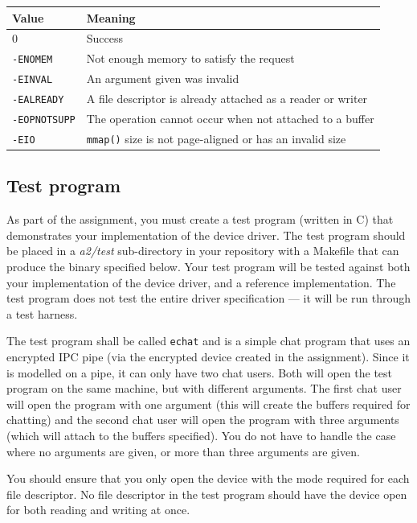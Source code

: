 \documentclass[12pt,a4paper]{article}
\begin{document}
\begin{longtable}{l l}
    \toprule
    \textbf{Value} & \textbf{Meaning} \\
    \midrule
    0 & Success \\
    \texttt{-ENOMEM} & Not enough memory to satisfy the request \\
    \texttt{-EINVAL} & An argument given was invalid \\
    \texttt{-EALREADY} & A file descriptor is already attached as a reader or writer \\
    \texttt{-EOPNOTSUPP} & The operation cannot occur when not attached to a buffer \\
    \texttt{-EIO} & \texttt{mmap()} size is not page-aligned or has an invalid size \\
    \bottomrule
\end{longtable}

\subsection*{Test program}

As part of the assignment, you must create a test program (written in C) that
demonstrates your implementation of the device driver. The test program should
be placed in a \textit{a2/test} sub-directory in your repository with a
Makefile that can produce the binary specified below. Your test program will be
tested against both your implementation of the device driver, and a reference
implementation. The test program does not test the entire driver specification
--- it will be run through a test harness.

The test program shall be called \texttt{echat} and is a simple chat program
that uses an encrypted IPC pipe (via the encrypted device created in the
assignment). Since it is modelled on a pipe, it can only have two chat users.
Both will open the test program on the same machine, but with different
arguments.  The first chat user will open the program with one argument (this
will create the buffers required for chatting) and the second chat user will
open the program with three arguments (which will attach to the buffers
specified).  You do not have to handle the case where no arguments are given,
or more than three arguments are given.

You should ensure that you only open the device with the mode required for each
file descriptor. No file descriptor in the test program should have the device open
for both reading and writing at once.
\end{document}
